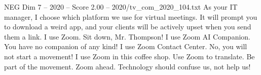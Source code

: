 \begin{textsample}{NEG Dim 7 – 2020 – Score 2.00 – 2020/tv\_com\_2020\_104.txt}  \label{ex:f7_neg_015}
As your IT manager, I choose which platform we use for virtual meetings.
It will prompt you to download a weird app, and your clients will be actively upset when you send them a link.
I use Zoom.
Sit down, Mr.
Thompson!
I use Zoom AI Companion.
You have no companion of any kind!
I use Zoom Contact Center.
No, you will not start a movement!
I use Zoom in this coffee shop.
Use Zoom to translate.
Be part of the movement.
Zoom ahead.
Technology should confuse us, not help us!

\end{textsample}
